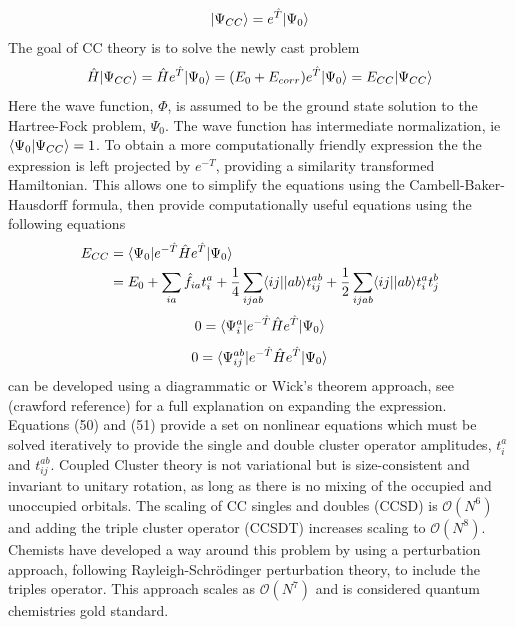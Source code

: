         \begin{equation}
          | \Psi_{CC} \rangle = e^{\hat{T}}| \Psi_0 \rangle
        \end{equation}
      The goal of CC theory is to solve the newly cast problem
        \begin{equation}
          \hat{H}| \Psi_{CC} \rangle = \hat{H} e^{\hat{T}} | \Psi_0 \rangle = (E_0 + E_{corr}) e^{\hat{T}} | \Psi_0 \rangle = E_{CC} | \Psi_{CC} \rangle
        \end{equation}
      Here the wave function, $\Phi$, is assumed to be the ground state solution to the Hartree-Fock problem, $\Psi_0$. The wave function has intermediate normalization, ie $\langle\Psi_0|\Psi_{CC}\rangle = 1$. To obtain a more computationally friendly expression the the expression is left projected by $e^{-\hat{T}}$, providing a similarity transformed Hamiltonian.  This allows one to simplify the equations using the Cambell-Baker-Hausdorff formula\cite{Crawford 2000}, then provide computationally useful equations using the following equations 
        \begin{equation}
          \begin{aligned}
            E_{CC} &= \langle\Psi_0 |e^{-\hat{T}} \hat{H} e^{\hat{T}} | \Psi_0 \rangle \\
            &= E_0 + \sum_{ia} \hat{f}_{ia}t^a_i + \frac{1}{4} \sum_{ijab} \langle ij || ab \rangle t^{ab}_{ij} + \frac{1}{2} \sum_{ijab} \langle ij || ab \rangle t^a_i t^b_j
          \end{aligned}
        \end{equation}
        \begin{equation}
          0 = \langle\Psi^a_i | e^{-\hat{T}} \hat{H} e^{\hat{T}} | \Psi_0 \rangle
        \end{equation}
        \begin{equation}
          0 = \langle\Psi^{ab}_{ij} | e^{-\hat{T}} \hat{H} e^{\hat{T}} | \Psi_0 \rangle
        \end{equation}
      can be developed using a diagrammatic or Wick's theorem approach, see (crawford reference) for a full explanation on expanding the expression.  Equations (50) and (51) provide a set on nonlinear equations which must be solved iteratively to provide the single and double cluster operator amplitudes, $t^a_i$ and $t^{ab}_{ij}$.
      Coupled Cluster theory is not variational but is size-consistent and invariant to unitary rotation, as long as there is no mixing of the occupied and unoccupied orbitals.  The scaling of CC singles and doubles (CCSD) is $\mathcal{O}(N^6)$ and adding the triple cluster operator (CCSDT) increases scaling to $\mathcal{O}(N^8)$\cite{Noga 1987, Scuseria 1988}. Chemists have developed a way around this problem by using a perturbation approach, following Rayleigh-Schr{\"o}dinger perturbation theory, to include the triples operator\cite{Crawford 2000}.  This approach scales as $\mathcal{O}(N^7)$ and is considered quantum chemistries gold standard.

